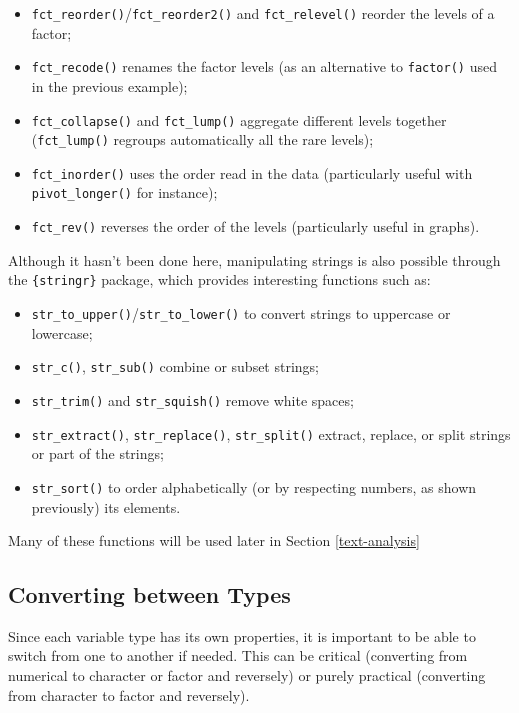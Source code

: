 \documentclass[
]{krantz}
\providecommand{\tightlist}{%
  \setlength{\itemsep}{0pt}\setlength{\parskip}{0pt}}
\begin{document}
\begin{itemize}
\tightlist
\item
  \texttt{fct\_reorder()}/\texttt{fct\_reorder2()} and \texttt{fct\_relevel()} reorder the levels of a factor;
\item
  \texttt{fct\_recode()} renames the factor levels (as an alternative to \texttt{factor()} used in the previous example);
\item
  \texttt{fct\_collapse()} and \texttt{fct\_lump()} aggregate different levels together (\texttt{fct\_lump()} regroups automatically all the rare levels);
\item
  \texttt{fct\_inorder()} uses the order read in the data (particularly useful with \texttt{pivot\_longer()} for instance);
\item
  \texttt{fct\_rev()} reverses the order of the levels (particularly useful in graphs).
\end{itemize}

Although it hasn't been done here, manipulating strings is also possible through the \texttt{\{stringr\}} package, which provides interesting functions such as:

\begin{itemize}
\tightlist
\item
  \texttt{str\_to\_upper()}/\texttt{str\_to\_lower()} to convert strings to uppercase or lowercase;
\item
  \texttt{str\_c()}, \texttt{str\_sub()} combine or subset strings;
\item
  \texttt{str\_trim()} and \texttt{str\_squish()} remove white spaces;
\item
  \texttt{str\_extract()}, \texttt{str\_replace()}, \texttt{str\_split()} extract, replace, or split strings or part of the strings;
\item
  \texttt{str\_sort()} to order alphabetically (or by respecting numbers, as shown previously) its elements.
\end{itemize}

Many of these functions will be used later in Section \ref{text-analysis}

\hypertarget{converting-between-types}{%
\subsection{Converting between Types}\label{converting-between-types}}

Since each variable type has its own properties, it is important to be able to switch from one to another if needed. This can be critical (converting from numerical to character or factor and reversely) or purely practical (converting from character to factor and reversely).
\end{document}
